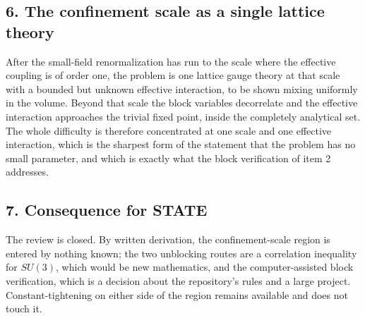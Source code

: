 \documentclass[11pt,a4paper]{article}
\begin{document}
\hypertarget{the-confinement-scale-as-a-single-lattice-theory}{%
\subsection{6. The confinement scale as a single lattice
theory}\label{the-confinement-scale-as-a-single-lattice-theory}}

After the small-field renormalization has run to the scale where the
effective coupling is of order one, the problem is one lattice gauge
theory at that scale with a bounded but unknown effective interaction,
to be shown mixing uniformly in the volume. Beyond that scale the block
variables decorrelate and the effective interaction approaches the
trivial fixed point, inside the completely analytical set. The whole
difficulty is therefore concentrated at one scale and one effective
interaction, which is the sharpest form of the statement that the
problem has no small parameter, and which is exactly what the block
verification of item 2 addresses.

\hypertarget{consequence-for-state}{%
\subsection{7. Consequence for STATE}\label{consequence-for-state}}

The review is closed. By written derivation, the confinement-scale
region is entered by nothing known; the two unblocking routes are a
correlation inequality for \(SU(3)\), which would be new mathematics,
and the computer-assisted block verification, which is a decision about
the repository's rules and a large project. Constant-tightening on
either side of the region remains available and does not touch it.
\end{document}
